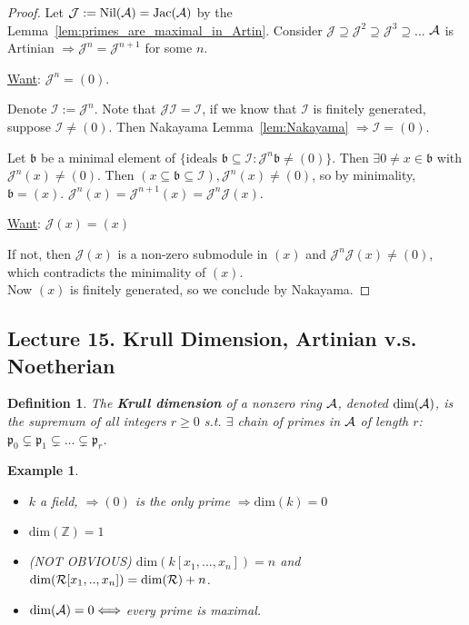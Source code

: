 \documentclass[11pt]{article}
\newtheorem{dfn}[thm]{Definition}
\newtheorem{ex}[thm]{Example}
\newcommand{\intg}{\mathbb Z}
\newcommand{\scb}{{\mathfrak b}}
\newcommand{\scp}{{\mathfrak p}}
\newcommand{\cala}{{\cal A}}
\newcommand{\calr}{{\cal R}}
\newcommand{\Lrta}{\Longrightarrow}
\newcommand{\Llrta}{\Longleftrightarrow}
\begin{document}
\begin{proof}
Let $\mathcal{J}:= \text{Nil}(  \cala)=\text{Jac}(\cala)$ by the Lemma~\ref{lem:primes_are_maximal_in_Artin}. Consider $\mathcal{J}\supseteq \mathcal{J}^2\supseteq \mathcal{J}^3\supseteq ...$ $\cala$ is Artinian   $\Lrta \mathcal{J}^n=\mathcal{J}^{n+1}$ for some $n$.

 \underline{Want}: $\mathcal{J}^n=(0)$.

Denote $\mathcal{I}:=\mathcal{J}^n$. Note that $\mathcal{J}\mathcal{I}=\mathcal{I}$, if we know that $\mathcal{I}$ is finitely generated, suppose $\mathcal{I}\neq (0)$. Then Nakayama Lemma~\ref{lem:Nakayama} $\Lrta \mathcal{I}=(0)$.

Let $\scb$ be a minimal element of $\{\text{ideals $\scb\subseteq \mathcal{I}:\mathcal{J}^n\scb\neq (0)$}\}$. Then $\exists 0\neq x\in \scb$ with $\mathcal{J}^n(x)\neq (0)$. Then $(x\subseteq \scb\subseteq \mathcal{I}), \mathcal{J}^n (x)\neq (0)$, so by minimality, $\scb=(x)$.
$\mathcal{J}^n(x)=\mathcal{J}^{n+1}(x)=\mathcal{J}^n\mathcal{J}(x)$.

\underline{Want}: $\mathcal{J}(x)=(x)$

If not, then $\mathcal{J}(x)$ is a non-zero submodule in $(x)$ and $\mathcal{J}^n\mathcal{J}(x)\neq (0)$, which contradicts the minimality of $(x)$.\\
Now $(x)$ is finitely generated, so we conclude by Nakayama.
\end{proof}
\subsection{Lecture 15. Krull Dimension, Artinian v.s. Noetherian}
\begin{dfn}
The \textbf{Krull dimension} of a nonzero ring $\cala$, denoted $\text{dim}(\cala)$, is the supremum of all integers $r\geq 0$ s.t. $\exists$ chain of primes in $\cala$ of length $r$: 
$\scp_0\subsetneq \scp_1\subsetneq...\subsetneq \scp_r$.
\end{dfn}

\begin{ex}\ 
\begin{itemize}
\item $k$ a field, $\Lrta (0)$ is the only prime $\Lrta \text{dim}(k)=0$
\item $\text{dim}(\intg)=1$
\item (NOT OBVIOUS) $\text{dim}(k[x_1,...,x_n])=n$
 and $\text{dim}(\calr[x_1,..,x_n])=\text{dim}(\calr)+n$.
\item $\text{dim}(\cala)=0\Llrta $ every prime is maximal.  
\end{itemize}
\end{ex}
\end{document}
